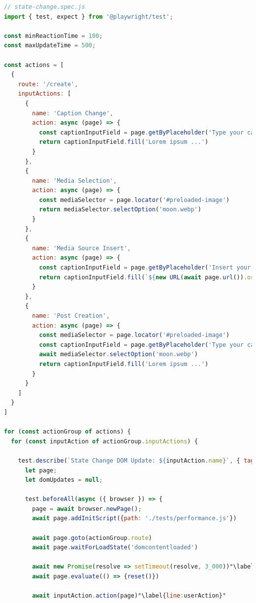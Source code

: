\documentclass[a4paper, 12pt]{article}
\begin{document}
\vspace{1cm}
\begin{lstlisting}[caption={Test file for component update times}, label={lst:state-change-spec}, language=JavaScript, escapechar=°]
// state-change.spec.js
import { test, expect } from '@playwright/test';

const minReactionTime = 100;
const maxUpdateTime = 500;

const actions = [
  {
    route: '/create',
    inputActions: [
      {
        name: 'Caption Change',
        action: async (page) => {
          const captionInputField = page.getByPlaceholder('Type your caption here')
          return captionInputField.fill('Lorem ipsum ...')
        }
      },
      {
        name: 'Media Selection',
        action: async (page) => {
          const mediaSelector = page.locator('#preloaded-image')
          return mediaSelector.selectOption('moon.webp')
        }
      },
      {
        name: 'Media Source Insert',
        action: async (page) => {
          const captionInputField = page.getByPlaceholder('Insert your media URL here...')
          return captionInputField.fill(`${new URL(await page.url()).origin}/abstract-circles.webp`)
        }
      },
      {
        name: 'Post Creation',
        action: async (page) => {
          const mediaSelector = page.locator('#preloaded-image')
          const captionInputField = page.getByPlaceholder('Type your caption here')
          await mediaSelector.selectOption('moon.webp')
          return captionInputField.fill('Lorem ipsum ...')
        }
      }
    ]
  }
]

for (const actionGroup of actions) {
  for (const inputAction of actionGroup.inputActions) {

    test.describe(`State Change DOM Update: ${inputAction.name}`, { tag: [`@${inputAction.name.replace(/\s/g, '')}`, '@stateChange'] }, () => {
      let page;
      let domUpdates = null;

      test.beforeAll(async ({ browser }) => {
        page = await browser.newPage();
        await page.addInitScript({path: './tests/performance.js'})

        await page.goto(actionGroup.route)
        await page.waitForLoadState('domcontentloaded')

        await new Promise(resolve => setTimeout(resolve, 3_000))°\label{line:actionDelay}°
        await page.evaluate(() => {reset()})

        await inputAction.action(page)°\label{line:userAction}°


\end{lstlisting}
\end{document}
